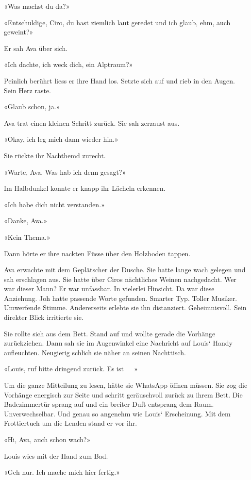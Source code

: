 «Was machst du da?»

«Entschuldige, Ciro, du hast ziemlich laut geredet und ich glaub, ehm,
auch geweint?»

Er sah Ava über sich.

«Ich dachte, ich weck dich, ein Alptraum?»

Peinlich berührt liess er ihre Hand los. Setzte sich auf und rieb in den
Augen. Sein Herz raste.

«Glaub schon, ja.»

Ava trat einen kleinen Schritt zurück. Sie sah zerzaust aus.

«Okay, ich leg mich dann wieder hin.»

Sie rückte ihr Nachthemd zurecht.

«Warte, Ava. Was hab ich denn gesagt?»

Im Halbdunkel konnte er knapp ihr Lächeln erkennen.

«Ich habe dich nicht verstanden.»

«Danke, Ava.»

«Kein Thema.»

Dann hörte er ihre nackten Füsse über den Holzboden tappen.

Ava erwachte mit dem Geplätscher der Dusche. Sie hatte lange wach
gelegen und sah erschlagen aus. Sie hatte über Ciros nächtliches Weinen
nachgedacht. Wer war dieser Mann? Er war unfassbar. In vielerlei
Hinsicht. Da war diese Anziehung. Joh hatte passende Worte gefunden.
Smarter Typ. Toller Musiker. Umwerfende Stimme. Andererseits erlebte sie
ihn distanziert. Geheimnisvoll. Sein direkter Blick irritierte sie.

Sie rollte sich aus dem Bett. Stand auf und wollte gerade die Vorhänge
zurückziehen. Dann sah sie im Augenwinkel eine Nachricht auf Louis`
Handy aufleuchten. Neugierig schlich sie näher an seinen Nachttisch.

«Louis, ruf bitte dringend zurück. Es ist\_\_»

Um die ganze Mitteilung zu lesen, hätte sie WhatsApp öffnen müssen. Sie
zog die Vorhänge energisch zur Seite und schritt geräuschvoll zurück zu
ihrem Bett. Die Badezimmertür sprang auf und ein breiter Duft entsprang
dem Raum. Unverwechselbar. Und genau so angenehm wie Louis` Erscheinung.
Mit dem Frottiertuch um die Lenden stand er vor ihr.

«Hi, Ava, auch schon wach?»

Louis wies mit der Hand zum Bad.

«Geh nur. Ich mache mich hier fertig.»

